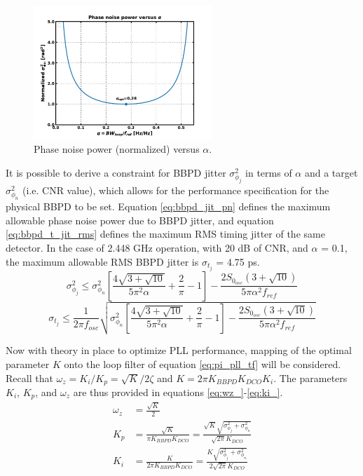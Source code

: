 			\begin{figure}[htb!]
				\center\includegraphics[width=0.6\textwidth, angle=0]{./figs/design/alpha_v_pn}
				\caption{Phase noise power (normalized) versus $\alpha$.}
				\label{fig:alpha_v_pn}
			\end{figure}

			It is possible to derive a constraint for BBPD jitter $\sigma^2_{\phi_j}$ in terms of $\alpha$ and a target $\sigma^2_{\phi_n}$ (i.e. CNR value), which allows for the performance specification for the physical BBPD to be set. Equation \ref{eq:bbpd_jit_pn} defines the maximum allowable phase noise power due to BBPD jitter, and equation \ref{eq:bbpd_t_jit_rms} defines the maximum RMS timing jitter of the same detector. In the case of 2.448 GHz operation, with 20 dB of CNR, and $\alpha$ = 0.1, the maximum allowable RMS BBPD jitter is $\sigma_{t_j}$ = 4.75 ps.
			\begin{equation}\label{eq:bbpd_jit_pn}
				\sigma^2_{\phi_j} \leq \sigma^2_{\phi_n}\left[\frac{4\sqrt{3+\sqrt{10}}}{5\pi^2\alpha} +\frac{2}{\pi} - 1 \right] - \frac{2S_{0_{osc}}(3 + \sqrt{10})}{5\pi\alpha^2f_{ref}}
			\end{equation}
			\begin{equation}\label{eq:bbpd_t_jit_rms}
				\sigma_{t_j} \leq \frac{1}{2\pi f_{osc}}\sqrt{\sigma^2_{\phi_n}\left[\frac{4\sqrt{3+\sqrt{10}}}{5\pi^2\alpha} +\frac{2}{\pi} - 1 \right] - \frac{2S_{0_{osc}}(3 + \sqrt{10})}{5\pi\alpha^2f_{ref}}}
			\end{equation}

			Now with theory in place to optimize PLL performance, mapping of the optimal parameter $K$ onto the loop filter of equation \ref{eq:pi_pll_tf} will be considered. Recall that $\omega_z = K_i/K_p = \sqrt{K}/2\zeta$ and $K = 2\pi K_{BBPD}K_{DCO}K_{i}$. The parameters $K_i$, $K_p$, and $\omega_z$ are thus provided in equations \ref{eq:wz_}-\ref{eq:ki_}.
			\begin{align}
				\omega_z &= \frac{\sqrt{K}}{2}\label{eq:wz_}\\
				K_p &= \frac{\sqrt{K}}{\pi K_{BBPD}K_{DCO}} = \frac{\sqrt{K}\sqrt{\sigma^2_{\phi_j} + \sigma^2_{\phi_n}}}{\sqrt{2\pi}K_{DCO}}\\
				K_i &= \frac{K}{2\pi K_{BBPD}K_{DCO}} = \frac{K\sqrt{\sigma^2_{\phi_j} + \sigma^2_{\phi_n}}}{2\sqrt{2\pi}K_{DCO}}\label{eq:ki_}
			\end{align}
	
